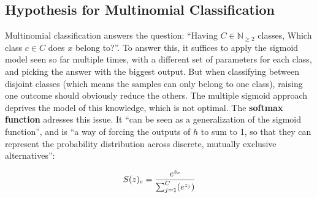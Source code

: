 

\subsection{Hypothesis for Multinomial Classification} \label{multiclass}
Multinomial classification answers the question: ``Having \(C\in\mathbb{N}_{\geq2}\) classes, Which class \(c\in C\) does \(x\) belong to?''. To answer this, it suffices to apply the sigmoid model seen so far multiple times, with a different set of parameters for each class, and picking the answer with the biggest output. But when classifying between disjoint classes (which means the samples can only belong to one class), raising one outcome should obviously reduce the others. The multiple sigmoid approach deprives the model of this knowledge, which is not optimal\cite{softmax}. The \textbf{softmax function} adresses this issue. It ``can be seen as a generalization of the sigmoid function''\cite[p.183]{goodfellow}, and is ``a way of forcing the outputs of \(h\) to sum to 1, so that they can represent the probability distribution across discrete, mutually exclusive alternatives''\cite{softmax}:

\begin{equation*}
  S(z)_c = \frac{e^{z_c}}{\sum_{j=1}^C(e^{z_j})}\\[3mm]
\end{equation*}

